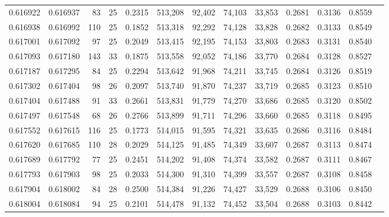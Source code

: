 \begin{tabular}{rrrrrrrrrrrrr}
0.616922 & 0.616937 &  83 &  25 &                                     0.2315 & 513,208 &  92,402 &  74,103 &  33,853 & 0.2681 & 0.3136 & 0.8559 \\
0.616938 & 0.616992 & 110 &  25 &                                     0.1852 & 513,318 &  92,292 &  74,128 &  33,828 & 0.2682 & 0.3133 & 0.8549 \\
0.617001 & 0.617092 &  97 &  25 &                                     0.2049 & 513,415 &  92,195 &  74,153 &  33,803 & 0.2683 & 0.3131 & 0.8540 \\
0.617093 & 0.617180 & 143 &  33 &                                     0.1875 & 513,558 &  92,052 &  74,186 &  33,770 & 0.2684 & 0.3128 & 0.8527 \\
0.617187 & 0.617295 &  84 &  25 &                                     0.2294 & 513,642 &  91,968 &  74,211 &  33,745 & 0.2684 & 0.3126 & 0.8519 \\
0.617302 & 0.617404 &  98 &  26 &                                     0.2097 & 513,740 &  91,870 &  74,237 &  33,719 & 0.2685 & 0.3123 & 0.8510 \\
0.617404 & 0.617488 &  91 &  33 &                                     0.2661 & 513,831 &  91,779 &  74,270 &  33,686 & 0.2685 & 0.3120 & 0.8502 \\
0.617497 & 0.617548 &  68 &  26 &                                     0.2766 & 513,899 &  91,711 &  74,296 &  33,660 & 0.2685 & 0.3118 & 0.8495 \\
0.617552 & 0.617615 & 116 &  25 &                                     0.1773 & 514,015 &  91,595 &  74,321 &  33,635 & 0.2686 & 0.3116 & 0.8484 \\
0.617620 & 0.617685 & 110 &  28 &                                     0.2029 & 514,125 &  91,485 &  74,349 &  33,607 & 0.2687 & 0.3113 & 0.8474 \\
0.617689 & 0.617792 &  77 &  25 &                                     0.2451 & 514,202 &  91,408 &  74,374 &  33,582 & 0.2687 & 0.3111 & 0.8467 \\
0.617793 & 0.617903 &  98 &  25 &                                     0.2033 & 514,300 &  91,310 &  74,399 &  33,557 & 0.2687 & 0.3108 & 0.8458 \\
0.617904 & 0.618002 &  84 &  28 &                                     0.2500 & 514,384 &  91,226 &  74,427 &  33,529 & 0.2688 & 0.3106 & 0.8450 \\
0.618004 & 0.618084 &  94 &  25 &                                     0.2101 & 514,478 &  91,132 &  74,452 &  33,504 & 0.2688 & 0.3103 & 0.8442 \\

\end{tabular}
